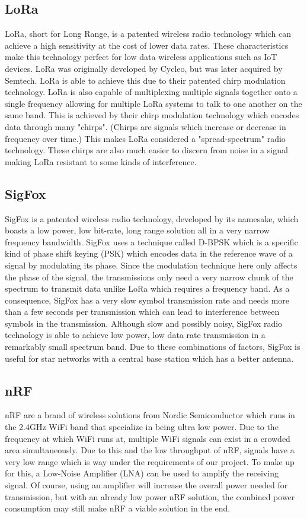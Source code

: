 \documentclass[draftclsnofoot,onecolumn, 10pt, compsoc]{IEEEtran}
\begin{document}
	\subsection{LoRa}
	LoRa, short for Long Range, is a patented wireless radio technology which can achieve a high sensitivity at the cost of lower data rates. These characteristics make this technology perfect for low data wireless applications such as IoT devices. LoRa was originally developed by Cycleo, but was later acquired by Semtech. LoRa is able to achieve this due to their patented chirp modulation technology. LoRa is also capable of multiplexing multiple signals together onto a single frequency allowing for multiple LoRa systems to talk to one another on the same band. This is achieved by their chirp modulation technology which encodes data through many "chirps". (Chirps are signals which increase or decrease in frequency over time.) This makes LoRa considered a "spread-spectrum" radio technology. These chirps are also much easier to discern from noise in a signal making LoRa resistant to some kinds of interference. 
	
	\subsection{SigFox}
	SigFox is a patented wireless radio technology, developed by its namesake, which boasts a low power, low bit-rate, long range solution all in a very narrow frequency bandwidth. SigFox uses a technique called D-BPSK which is a specific kind of phase shift keying (PSK) which encodes data in the reference wave of a signal by modulating its phase. Since the modulation technique here only affects the phase of the signal, the transmissions only need a very narrow chunk of the spectrum to transmit data unlike LoRa which requires a frequency band. As a consequence, SigFox has a very slow symbol transmission rate and needs more than a few seconds per transmission which can lead to interference between symbols in the transmission. Although slow and possibly noisy, SigFox radio technology is able to achieve low power, low data rate transmission in a remarkably small spectrum band. Due to these combinations of factors, SigFox is useful for star networks with a central base station which has a better antenna.
	
	\subsection{nRF}
	nRF are a brand of wireless solutions from Nordic Semiconductor which runs in the 2.4GHz WiFi band that specialize in being ultra low power. Due to the frequency at which WiFi runs at, multiple WiFi signals can exist in a crowded area simultaneously. Due to this and the low throughput of nRF, signals have a very low range which is way under the requirements of our project. To make up for this, a Low-Noise Amplifier (LNA) can be used to amplify the receiving signal. Of course, using an amplifier will increase the overall power needed for transmission, but with an already low power nRF solution, the combined power consumption may still make nRF a viable solution in the end.
	
\end{document}

